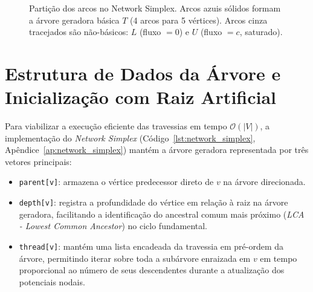 \begin{figure}[!ht]
\centering
{}
\caption{Partição dos arcos no Network Simplex. Arcos azuis sólidos formam a árvore geradora básica $T$ (4 arcos para 5 vértices). Arcos cinza tracejados são não-básicos: $L$ (fluxo $= 0$) e $U$ (fluxo $= c$, saturado).}
\label{fig:arvore_base}
\end{figure}


\section{Estrutura de Dados da Árvore e Inicialização com Raiz Artificial}

Para viabilizar a execução eficiente das travessias em tempo $\mathcal{O}(|V|)$, a implementação do \textit{Network Simplex} (Código~\ref{lst:network_simplex}, Apêndice~\ref{ap:network_simplex}) mantém a árvore geradora representada por três vetores principais:
\begin{itemize}
    \item \lstinline{parent[v]}: armazena o vértice predecessor direto de $v$ na árvore direcionada.
    \item \lstinline{depth[v]}: registra a profundidade do vértice em relação à raiz na árvore geradora, facilitando a identificação do ancestral comum mais próximo (\textit{LCA - Lowest Common Ancestor}) no ciclo fundamental.
    \item \lstinline{thread[v]}: mantém uma lista encadeada da travessia em pré-ordem da árvore, permitindo iterar sobre toda a subárvore enraizada em $v$ em tempo proporcional ao número de seus descendentes durante a atualização dos potenciais nodais.
\end{itemize}


